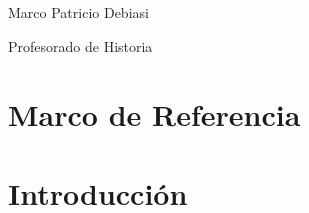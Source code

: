 \documentclass[a4paper,13pt,titlepage,oneside]{article}
\newcounter{ns}
\begin{document}
	\begin{titlepage}
	\vspace{1.5cm}


	\fontsize{22pt}{20pt}\selectfont Marco Patricio Debiasi\par
	\vspace{1cm}
	\fontsize{22pt}{10pt}\selectfont Profesorado de Historia\par
	\end{titlepage}


\newpage

\section{Marco de Referencia}

\newpage

\section{Introducción}

\newpage
\end{document}

